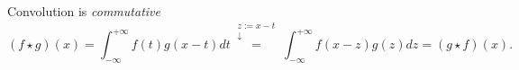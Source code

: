 

Convolution is \emph{commutative}
\begin{equation}
    (f\star g)(x) = \int_{-\infty}^{+\infty} f(t) g(x-t) dt \stackrel{\substack{z:=x-t\\\downarrow}}{=} \int_{-\infty}^{+\infty} f(x-z) g(z) dz = (g \star f)(x).
\end{equation}